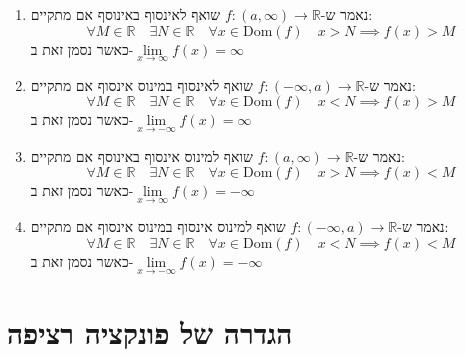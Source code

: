 \documentclass{tstextbook}
\begin{document}
\begin{definition}
  \begin{enumerate}
    \item נאמר ש-\(f:\left( a,\infty \right)\to \mathbb{R}\) שואף לאינסוף באינוסף אם מתקיים: 
$$\forall M  \in \mathbb{R}\quad \exists N \in \mathbb{R}\quad  \forall x \in \mathrm{Dom}(f)\quad  x > N\implies f(x)>M$$
כאשר נסמן זאת ב-\(\underset{ x \to \infty }{\lim }f(x)=\infty\)


    \item נאמר ש-\(f:\left(-\infty,a \right)\to \mathbb{R}\) שואף לאינסוף במינוס אינסוף אם מתקיים: 
$$\forall M  \in \mathbb{R}\quad \exists N \in \mathbb{R}\quad  \forall x \in \mathrm{Dom}(f)\quad  x < N\implies f(x)>M$$
כאשר נסמן זאת ב-\(\underset{ x \to -\infty }{\lim }f(x)=\infty\)


    \item נאמר ש-\(f:\left( a,\infty \right)\to \mathbb{R}\) שואף למינוס אינסוף באינוסף אם מתקיים: 
$$\forall M  \in \mathbb{R}\quad \exists N \in \mathbb{R}\quad  \forall x \in \mathrm{Dom}(f)\quad  x > N\implies f(x)<M$$
כאשר נסמן זאת ב-\(\underset{ x \to \infty }{\lim }f(x)=-\infty\)


    \item נאמר ש-\(f:\left(-\infty,a \right)\to \mathbb{R}\) שואף למינוס אינסוף במינוס אינסוף אם מתקיים: 
$$\forall M  \in \mathbb{R}\quad \exists N \in \mathbb{R}\quad  \forall x \in \mathrm{Dom}(f)\quad  x < N\implies f(x)<M$$
כאשר נסמן זאת ב-\(\underset{ x \to -\infty }{\lim }f(x)=-\infty\)


  \end{enumerate}
\end{definition}

\section{הגדרה של פונקציה רציפה}
\end{document}
